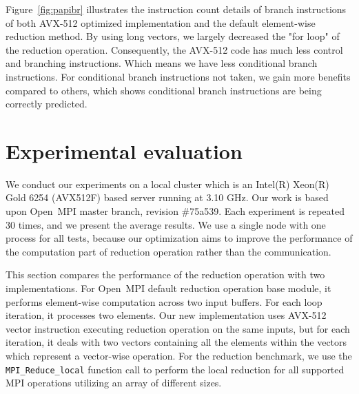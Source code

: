 \documentclass[5p,times,twocolumn]{elsarticle}
\newcommand{\mpifunc}[1]{\lstinline"MPI_#1"\xspace}
\newcommand{\ompi}[0]{Open~MPI\xspace}
\begin{document}
Figure~\ref{fig:papibr} illustrates the instruction count details
of branch instructions of both AVX-512 optimized implementation and the default
element-wise reduction method. By using long vectors, we largely decreased the "for loop" of the reduction
operation. Consequently, the AVX-512 code has much less control and branching instructions.
Which means we have less conditional branch instructions.
For conditional branch instructions not taken, we gain
more benefits compared to others, which shows conditional branch instructions are being correctly predicted.


\section{Experimental evaluation}\label{sec:experiments}
We conduct our experiments on a local cluster which is an Intel(R)
Xeon(R) Gold 6254 (AVX512F) based server running at 3.10 GHz. Our work is based
upon \ompi master branch, revision \#75a539. Each experiment is
repeated 30 times, and we present the average results.
We use a single node with one
process for all tests, because our optimization aims to improve the performance of
the computation part of reduction operation rather than the
communication.

This section compares the performance of the reduction operation with two
implementations.
For \ompi default reduction operation base module, it
performs element-wise computation across two input buffers. For each loop iteration,
it processes two elements. Our new implementation uses AVX-512 vector instruction
executing reduction operation on the same inputs, but for each iteration, it
deals with two vectors containing all the elements within the vectors which represent
a vector-wise operation.
For the reduction benchmark, we use the \mpifunc{Reduce_local} function call to
perform the local reduction for all supported MPI operations utilizing an array of different sizes.
\end{document}
